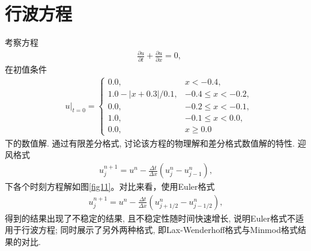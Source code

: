 \documentclass[10.5pt
]{article}
\begin{document}
\section{行波方程}
考察方程
\begin{align}
& \frac{\partial u}{\partial t} + \frac{\partial u}{\partial x} = 0,
\label{EqnCon}
\end{align}
在初值条件
\begin{align}
& u|_{t=0} = \left\{\begin{array}{ll} 0.0, & x < -0.4, \\
1.0 - |x + 0.3| / 0.1, & -0.4 \le x < -0.2, \\
0.0, & -0.2 \le x < -0.1, \\
1.0 , & -0.1 \le x < 0.0, \\
0.0, & x \ge 0.0
\end{array}\right.
\end{align}
下的数值解. 通过有限差分格式, 讨论该方程的物理解和差分格式数值解的特性.
迎风格式
\begin{align}
u_j^{n+1} = u^n - \frac{\Delta t}{\Delta x} (u_j^n - u_{j-1}^n), \label{EqnUpwind}
\end{align}
下各个时刻方程解如图\ref{fig11}。对比来看，使用Euler格式
\begin{align}
u_j^{n+1} = u^n - \frac{\Delta t}{\Delta x} (u_{j+1/2}^n- u_{j-1/2}^n), \label{EqnEuler}
\end{align}
得到的结果出现了不稳定的结果, 且不稳定性随时间快速增长, 说明Euler格式不适用于行波方程; 同时展示了另外两种格式, 即Lax-Wenderhoff格式与Minmod格式结果的对比. 
\end{document}
